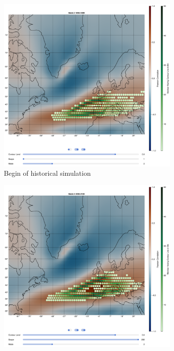 \begin{figure}[!htb]
  \begin{subfigure}[b]{0.49\textwidth}
    \includegraphics[width=\textwidth]{figures/psl_ivt_cor_mode2_historical.png}
    \caption{Begin of historical simulation}
    \label{fig:psl eof ivt cor historical mode2}
  \end{subfigure}
  \hfill
  \begin{subfigure}[b]{0.49\textwidth}
    \includegraphics[width=\textwidth]{figures/psl_ivt_cor_mode2_ssp126.png}

\end{subfigure}
\end{figure}
